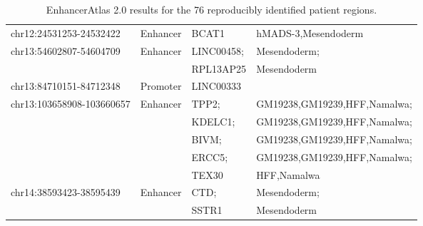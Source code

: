 \begin{table}[]
\begin{tabularx}{\textwidth}{lllX}
    chr12:24531253-24532422                    & Enhancer                   & BCAT1       & hMADS-3,Mesendoderm                                                             \\
    \multirow{2}{*}{chr13:54602807-54604709}   & \multirow{2}{*}{Enhancer}  & LINC00458;  & Mesendoderm;                                                                    \\
                                               &                            & RPL13AP25   & Mesendoderm                                                                     \\
    chr13:84710151-84712348                    & Promoter                   & LINC00333   &                                                                                 \\
    \multirow{5}{*}{chr13:103658908-103660657} & \multirow{5}{*}{Enhancer}  & TPP2;       & GM19238,GM19239,HFF,Namalwa;                                                    \\
                                               &                            & KDELC1;     & GM19238,GM19239,HFF,Namalwa;                                                    \\
                                               &                            & BIVM;       & GM19238,GM19239,HFF,Namalwa;                                                    \\
                                               &                            & ERCC5;      & GM19238,GM19239,HFF,Namalwa;                                                    \\
                                               &                            & TEX30       & HFF,Namalwa                                                                     \\
    \multirow{2}{*}{chr14:38593423-38595439}   & \multirow{2}{*}{Enhancer}  & CTD;        & Mesendoderm;                                                                    \\
                                               &                            & SSTR1       & Mesendoderm                                                                     \\ \cmidrule(l){1-4} 
    \end{tabularx}
    \caption{EnhancerAtlas 2.0 results for the 76 reproducibly identified patient regions.}
    \label{table:mll_enhancer}
    \end{table}



